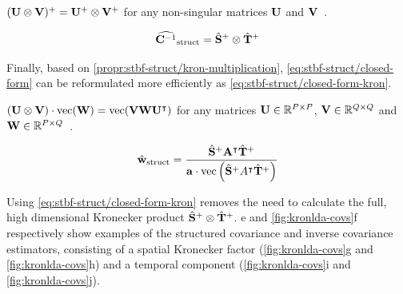 	\begin{property}
    $(\mathbf{U} \otimes \mathbf{V})^+ = \mathbf{U}^+ \otimes \mathbf{V}^+$ for any non-singular
    matrices $\mathbf{U}$ and $\mathbf{V}$~\cite{Langville2004}.
		\label{prop:stbf-struct/inverse-kronecker}
	\end{property}

	\begin{equation}
    \widehat{\mathbf{C}^{-1}}_\text{struct} = \hat{\mathbf{S}}^+ \otimes \hat{\mathbf{T}}^+
		\label{eq:stbf-struct/cov-inverse-kronecker}
	\end{equation}

	Finally, based on \cref{propr:stbf-struct/kron-multiplication},
	\cref{eq:stbf-struct/closed-form} can be reformulated more efficiently as
	\cref{eq:stbf-struct/closed-form-kron}.
	\begin{property}
    $(\mathbf{U}\otimes \mathbf{V})\cdot\operatorname{vec}(\mathbf{W}) =
    \operatorname{vec}(\mathbf{V}\mathbf{W}\mathbf{U}^\intercal)$
    for any matrices $\mathbf{U}\in\mathbb{R}^{P\times P}$,
    $\mathbf{V}\in\mathbb{R}^{Q\times Q}$ and $\mathbf{W}\in\mathbb{R}^{P\times Q}$~\cite{Loan2000}.
		\label{propr:stbf-struct/kron-multiplication}
	\end{property}

	\begin{equation}
		\hat{\mathbf{w}}_\text{struct} =
    \frac{\hat{\mathbf{S}}^+\mathbf{A}^\intercal\hat{\mathbf{T}}^+}
    {\mathbf{a}\cdot\operatorname{vec}\left(\hat{\mathbf{S}}^+A^\intercal\hat{\mathbf{T}}^+\right)}
		\label{eq:stbf-struct/closed-form-kron}
	\end{equation}

	Using \cref{eq:stbf-struct/closed-form-kron} removes the need to calculate the
  full, high dimensional Kronecker product $\hat{\mathbf{S}}^+\otimes
    \hat{\mathbf{T}}^+$.
	e and \cref{fig:kronlda-covs}f respectively show examples of the
	structured covariance and inverse covariance estimators,
	consisting of a spatial Kronecker factor (\cref{fig:kronlda-covs}g and
	\cref{fig:kronlda-covs}h) and a temporal component (\cref{fig:kronlda-covs}i and
	\cref{fig:kronlda-covs}j).

